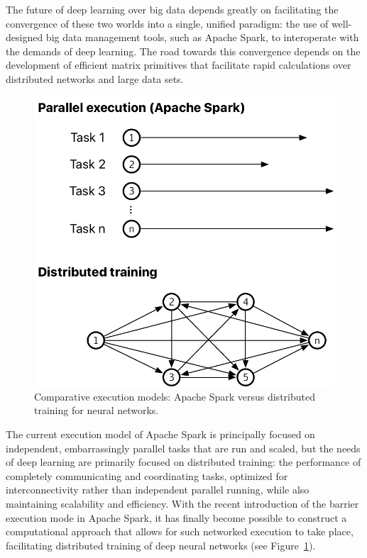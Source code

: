 \documentclass[fleqn,10pt]{SelfArx} %
\begin{document}
The future of deep learning over big data depends greatly on facilitating the convergence of these two worlds into a single, unified paradigm: the use of well-designed big data management tools, such as Apache Spark, to interoperate with the demands of deep learning. The road towards this convergence depends on the development of efficient matrix primitives that facilitate rapid calculations over distributed networks and large data sets.

\begin{figure}
	\centering
	\includegraphics[width=0.9\linewidth]{figures/fig1.pdf}
	\vspace{14pt}
	\caption{Comparative execution models: Apache Spark versus distributed training for neural networks.}
	\label{fig:execution-models}
\end{figure}

The current execution model of Apache Spark is principally focused on independent, embarrassingly parallel tasks that are run and scaled, but the needs of deep learning are primarily focused on distributed training: the performance of completely communicating and coordinating tasks, optimized for interconnectivity rather than independent parallel running, while also maintaining scalability and efficiency. With the recent introduction of the barrier execution mode in Apache Spark, it has finally become possible to construct a computational approach that allows for such networked execution to take place, facilitating distributed training of deep neural networks (see Figure~\ref{fig:execution-models}).
\end{document}
